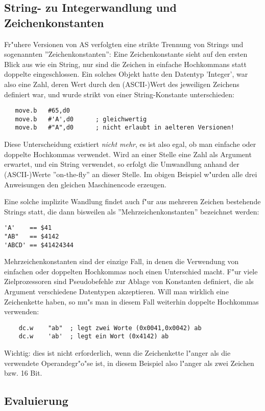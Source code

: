 \documentclass[12pt,a4paper,twoside]{report}
\begin{document}
\subsection{String- zu Integerwandlung und Zeichenkonstanten}

Fr"uhere Versionen von AS verfolgten eine strikte Trennung von Strings
und sogenannten ''Zeichenkonstanten'': Eine Zeichenkonstante sieht
auf den ersten Blick aus wie ein String, nur sind die Zeichen in 
einfache Hochkommans statt doppelte eingeschlossen.  Ein solches
Objekt hatte den Datentyp 'Integer', war also eine Zahl, deren Wert
durch den (ASCII-)Wert des jeweiligen Zeichens definiert war, und wurde
strikt von einer String-Konstante unterschieden:

\begin{verbatim}
   move.b   #65,d0
   move.b   #'A',d0      ; gleichwertig
   move.b   #"A",d0      ; nicht erlaubt in aelteren Versionen!
\end{verbatim}

Diese Unterscheidung existiert {\em nicht mehr}, es ist also egal, ob
man einfache oder doppelte Hochkommas verwendet.  Wird an einer Stelle eine
Zahl als Argument erwartet, und ein String verwendet, so erfolgt die
Umwandlung anhand der (ASCII-)Werte ''on-the-fly'' an dieser Stelle.  Im
obigen Beispiel w"urden alle drei Anweisungen den gleichen Maschinencode
erzeugen.

Eine solche implizite Wandlung findet auch f"ur aus mehreren Zeichen
bestehende Strings statt, die dann bisweilen als ''Mehrzeichenkonstanten''
bezeichnet werden:
\begin{verbatim}
'A'    == $41
"AB"   == $4142
'ABCD' == $41424344
\end{verbatim}
Mehrzeichenkonstanten sind der einzige Fall, in denen die Verwendung von
einfachen oder doppelten Hochkommas noch einen Unterschied macht.  F"ur
viele Zielprozessoren sind Pseudobefehle zur Ablage von Konstanten definiert,
die als Argument verschiedene Datentypen akzeptieren.  Will man wirklich
eine Zeichenkette haben, so mu"s man in diesem Fall weiterhin doppelte
Hochkommas verwenden:
\begin{verbatim}
    dc.w    "ab"  ; legt zwei Worte (0x0041,0x0042) ab
    dc.w    'ab'  ; legt ein Wort (0x4142) ab
\end{verbatim}
Wichtig: dies ist nicht erforderlich, wenn die Zeichenkette l"anger als die
verwendete Operandegr"o"se ist, in diesem Beispiel also l"anger als zwei
Zeichen bzw. 16 Bit.

\subsection{Evaluierung}
\end{document}
